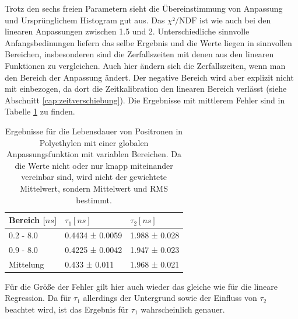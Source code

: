 \documentclass[a4paper,12pt]{article}
\begin{document}
Trotz den sechs freien Parametern sieht die Übereinstimmung von Anpassung und Ursprünglichem
Histogram gut aus. Das $χ²/\text{NDF}$ ist wie auch bei den linearen Anpassungen zwischen 1.5 und 2.
Unterschiedliche sinnvolle Anfangsbedinungen liefern das selbe Ergebnis und die Werte liegen in
sinnvollen Bereichen, insbesonderen sind die Zerfallszeiten mit denen aus den linearen Funktionen zu
vergleichen.
Auch hier ändern sich die Zerfallszeiten, wenn man den Bereich der Anpassung ändert. Der negative
Bereich wird aber explizit nicht mit einbezogen, da dort die Zeitkalibration den linearen Bereich
verlässt (siehe Abschnitt \ref{cap:zeitverschiebung}).
Die Ergebnisse mit mittlerem Fehler sind in Tabelle \ref{tab:globalPoly} zu finden.
\begin{table}
	\begin{tabular}{l |l l}
		Bereich [$\si{ns}$] & $τ_1 [\si{ns}]$ & $τ_2 [\si{ns}]$ \\
		\hline
		0.2 - 8.0 & 0.4434 ± 0.0059 &1.988 ± 0.028\\
		0.9 - 8.0 & 0.4225 ± 0.0042 & 1.947 ± 0.023\\
		\hline
		\hline
		Mittelung & 0.433 ± 0.011 & 1.968 ± 0.021
	\end{tabular}
	\centering
	\caption{Ergebnisse für die Lebensdauer von Positronen in Polyethylen mit einer globalen
	Anpassungsfunktion mit variablen Bereichen. Da die Werte nicht oder nur knapp miteinander
		vereinbar sind, wird nicht der gewichtete Mittelwert, sondern Mittelwert und RMS bestimmt.}
	\label{tab:globalPoly}
\end{table}

Für die Größe der Fehler gilt hier auch wieder das gleiche wie für die lineare Regression. Da für
$τ_1$ allerdings der Untergrund sowie der Einfluss von $τ_2$ beachtet wird, ist das Ergebnis für
$τ_1$ wahrscheinlich genauer.
\end{document}
